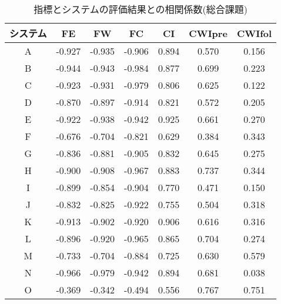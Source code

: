 \begin{table*}
\begin{center}\small
\caption{指標とシステムの評価結果との相関係数(総合課題)}
\label{table:each_system_index_general}
\begin{tabular}{c|cccc|cc} \hline
システム & FE     & FW     & FC     & CI    & CWIpre & CWIfol \\ \hline
A        & -0.927 & -0.935 & -0.906 & 0.894 & 0.570  & 0.156  \\       
B        & -0.944 & -0.943 & -0.984 & 0.877 & 0.699  & 0.223  \\       
C        & -0.923 & -0.931 & -0.979 & 0.806 & 0.625  & 0.122  \\       
D        & -0.870 & -0.897 & -0.914 & 0.821 & 0.572  & 0.205  \\       
E        & -0.922 & -0.938 & -0.942 & 0.925 & 0.661  & 0.270  \\       
F        & -0.676 & -0.704 & -0.821 & 0.629 & 0.384  & 0.343  \\       
G        & -0.836 & -0.881 & -0.905 & 0.832 & 0.645  & 0.275  \\       
H        & -0.900 & -0.908 & -0.967 & 0.883 & 0.737  & 0.344  \\       
I        & -0.899 & -0.854 & -0.904 & 0.770 & 0.471  & 0.150  \\       
J        & -0.832 & -0.825 & -0.922 & 0.755 & 0.504  & 0.318  \\       
K        & -0.913 & -0.902 & -0.920 & 0.906 & 0.616  & 0.316  \\       
L        & -0.896 & -0.920 & -0.965 & 0.865 & 0.704  & 0.274  \\       
M        & -0.733 & -0.704 & -0.884 & 0.725 & 0.630  & 0.579  \\       
N        & -0.966 & -0.979 & -0.942 & 0.894 & 0.681  & 0.038  \\       
O        & -0.369 & -0.342 & -0.494 & 0.556 & 0.767  & 0.751  \\ \hline
\end{tabular}
\end{center}
\end{table*}
									   					  
